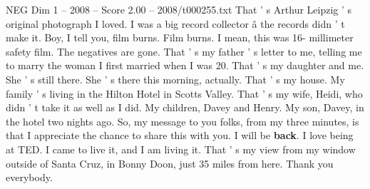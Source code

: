 \begin{textsample}{NEG Dim 1 – 2008 – Score 2.00 – 2008/t000255.txt}
That ' s Arthur Leipzig ' s original photograph I loved.
I was a big record collector â the records didn ' t make it.
Boy, I tell you, film burns.
Film burns.
I mean, this was 16- millimeter safety film.
The negatives are gone.
That ' s my father ' s letter to me, telling me to marry the woman I first married when I was 20.
That ' s my daughter and me.
She ' s still there.
She ' s there this morning, actually.
That ' s my house.
My family ' s living in the Hilton Hotel in Scotts Valley.
That ' s my wife, Heidi, who didn ' t take it as well as I did.
My children, Davey and Henry.
My son, Davey, in the hotel two nights ago.
So, my message to you folks, from my three minutes, is that I appreciate the chance to share this with you.
I will be \textbf{back}.
I love being at TED.
I came to live it, and I am living it.
That ' s my view from my window outside of Santa Cruz, in Bonny Doon, just 35 miles from here.
Thank you everybody.

\end{textsample}
